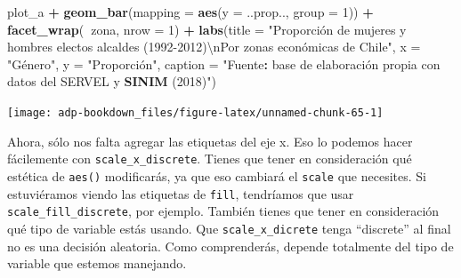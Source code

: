 \documentclass[]{book}
\newenvironment{Shaded}{\begin{snugshade}}{\end{snugshade}}
\newcommand{\CharTok}[1]{\textcolor[rgb]{0.31,0.60,0.02}{#1}}
\newcommand{\DataTypeTok}[1]{\textcolor[rgb]{0.13,0.29,0.53}{#1}}
\newcommand{\DecValTok}[1]{\textcolor[rgb]{0.00,0.00,0.81}{#1}}
\newcommand{\KeywordTok}[1]{\textcolor[rgb]{0.13,0.29,0.53}{\textbf{#1}}}
\newcommand{\NormalTok}[1]{#1}
\newcommand{\OperatorTok}[1]{\textcolor[rgb]{0.81,0.36,0.00}{\textbf{#1}}}
\newcommand{\StringTok}[1]{\textcolor[rgb]{0.31,0.60,0.02}{#1}}
\begin{document}
\begin{Shaded}
\begin{Highlighting}[]
\NormalTok{plot_a }\OperatorTok{+}\StringTok{ }
\StringTok{  }\KeywordTok{geom_bar}\NormalTok{(}\DataTypeTok{mapping =} \KeywordTok{aes}\NormalTok{(}\DataTypeTok{y =}\NormalTok{ ..prop.., }\DataTypeTok{group =} \DecValTok{1}\NormalTok{)) }\OperatorTok{+}
\StringTok{  }\KeywordTok{facet_wrap}\NormalTok{(}\OperatorTok{~}\NormalTok{zona, }\DataTypeTok{nrow =} \DecValTok{1}\NormalTok{) }\OperatorTok{+}
\StringTok{  }\KeywordTok{labs}\NormalTok{(}\DataTypeTok{title =} \StringTok{"Proporción de mujeres y hombres electos alcaldes (1992-2012)}\CharTok{\textbackslash{}n}\StringTok{Por zonas económicas de Chile"}\NormalTok{, }
       \DataTypeTok{x =} \StringTok{"Género"}\NormalTok{, }\DataTypeTok{y =} \StringTok{"Proporción", }
\StringTok{       caption = "}\NormalTok{Fuente}\OperatorTok{:}\StringTok{ }\NormalTok{base de elaboración propia con datos del SERVEL y }\KeywordTok{SINIM}\NormalTok{ (}\DecValTok{2018}\NormalTok{)}\StringTok{") }
\end{Highlighting}
\end{Shaded}

\begin{center}\texttt{[image: adp-bookdown\_files/figure-latex/unnamed-chunk-65-1]} \end{center}

Ahora, sólo nos falta agregar las etiquetas del eje x. Eso lo podemos
hacer fácilemente con \texttt{scale\_x\_discrete}. Tienes que tener en
consideración qué estética de \texttt{aes()} modificarás, ya que eso
cambiará el \texttt{scale} que necesites. Si estuviéramos viendo las
etiquetas de \texttt{fill}, tendríamos que usar
\texttt{scale\_fill\_discrete}, por ejemplo. También tienes que tener en
consideración qué tipo de variable estás usando. Que
\texttt{scale\_x\_dicrete} tenga ``discrete'' al final no es una
decisión aleatoria. Como comprenderás, depende totalmente del tipo de
variable que estemos manejando.
\end{document}
